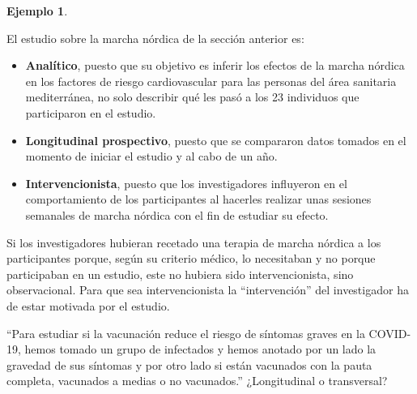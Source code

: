 \documentclass[
]{book}
\theoremstyle{definition}
\theoremstyle{definition}
\newtheorem{example}{Ejemplo}[chapter]
\theoremstyle{definition}
\theoremstyle{definition}
\theoremstyle{remark}
\begin{document}
\begin{example}
\protect\hypertarget{exm:unnamed-chunk-15}{}\label{exm:unnamed-chunk-15}

El estudio sobre la marcha nórdica de la sección anterior es:

\begin{itemize}
\item
  \textbf{Analítico}, puesto que su objetivo es inferir los efectos de la marcha nórdica en los factores de riesgo cardiovascular para las personas del área sanitaria mediterránea, no solo describir qué les pasó a los 23 individuos que participaron en el estudio.
\item
  \textbf{Longitudinal prospectivo}, puesto que se compararon datos tomados en el momento de iniciar el estudio y al cabo de un año.
\item
  \textbf{Intervencionista}, puesto que los investigadores influyeron en el comportamiento de los participantes al hacerles realizar unas sesiones semanales de marcha nórdica con el fin de estudiar su efecto.
\end{itemize}

\end{example}

\begin{rmdnote}
Si los investigadores hubieran recetado una terapia de marcha nórdica a los participantes porque, según su criterio médico, lo necesitaban y no porque participaban en un estudio, este no hubiera sido intervencionista, sino observacional. Para que sea intervencionista la ``intervención'' del investigador ha de estar motivada por el estudio.
\end{rmdnote}

\begin{rmdexercici}
``Para estudiar si la vacunación reduce el riesgo de síntomas graves en la COVID-19, hemos tomado un grupo de infectados y hemos anotado por un lado la gravedad de sus síntomas y por otro lado si están vacunados con la pauta completa, vacunados a medias o no vacunados.'' ¿Longitudinal o transversal?
\end{rmdexercici}
\end{document}
